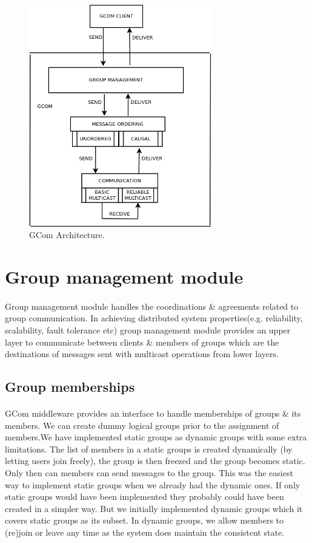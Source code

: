 \documentclass[a4paper,english,twoside]{article}
\begin{document}
\begin{figure}[h]
\centering \includegraphics[width=300px]{High_Abstraction.png}
\caption{GCom Architecture.}
\label{fig:gcom_archi}
\end{figure}
\newpage
\section{Group management module}
\paragraph{}
Group management module handles the coordinations \& agreements related to group communication. In achieving distributed system properties(e.g. reliability, scalability, fault tolerance etc) group management module provides an upper layer to communicate between clients \& members of groups which are the destinations of messages sent with multicast operations from lower layers.
\subsection{Group memberships}
\paragraph{}
GCom middleware provides an interface to handle memberships of groups \& its members. We can create dummy logical groups prior to the assignment of members.We have implemented static groups as dynamic groups with some extra limitations.
The list of members in a static groups is created dynamically (by letting users join freely), the group is then freezed and the group becomes static. Only then can members can send messages to the group. This was the easiest way to implement static groups when we already had the dynamic ones. If only static groups would have been implemented they probably could have been created in a simpler way. But we initially implemented dynamic groups which it covers static groups as its subset. In dynamic groups, we allow members to (re)join or leave any time as the system does maintain the consistent state.
\end{document}
